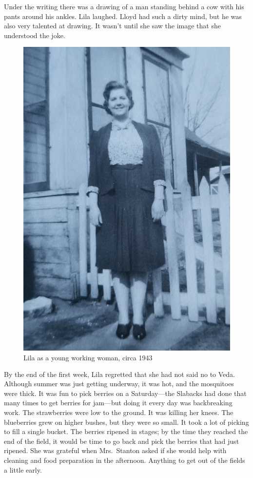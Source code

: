 \documentclass[
  letterpaper,
]{book}
\begin{document}
Under the writing there was a drawing of a man standing behind a cow
with his pants around his ankles. Lila laughed. Lloyd had such a dirty
mind, but he was also very talented at drawing. It wasn't until she saw
the image that she understood the joke.

\begin{figure}[H]

{\centering \includegraphics[width=0.65\linewidth,height=\textheight,keepaspectratio]{images/Akou15.jpg}

}

\caption{Lila as a young working woman, circa 1943}

\end{figure}%

By the end of the first week, Lila regretted that she had not said no to
Veda. Although summer was just getting underway, it was hot, and the
mosquitoes were thick. It was fun to pick berries on a Saturday---the
Slabacks had done that many times to get berries for jam---but doing it
every day was backbreaking work. The strawberries were low to the
ground. It was killing her knees. The blueberries grew on higher bushes,
but they were so small. It took a lot of picking to fill a single
bucket. The berries ripened in stages; by the time they reached the end
of the field, it would be time to go back and pick the berries that had
just ripened. She was grateful when Mrs.~Stanton asked if she would help
with cleaning and food preparation in the afternoon. Anything to get out
of the fields a little early.
\end{document}
